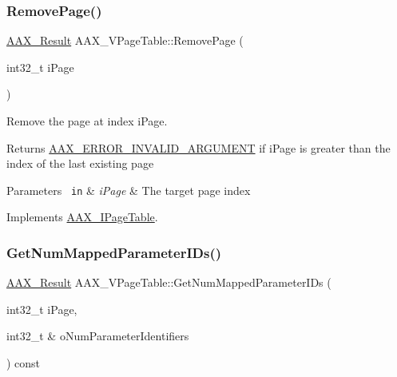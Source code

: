 \subsubsection{\texorpdfstring{RemovePage()}{RemovePage()}}
{\footnotesize\ttfamily \mbox{\hyperlink{a00392_a4d8f69a697df7f70c3a8e9b8ee130d2f}{A\+A\+X\+\_\+\+Result}} A\+A\+X\+\_\+\+V\+Page\+Table\+::\+Remove\+Page (\begin{DoxyParamCaption}\item[{int32\+\_\+t}]{i\+Page }\end{DoxyParamCaption})\hspace{0.3cm}{\ttfamily [virtual]}}



Remove the page at index {\ttfamily i\+Page}. 

\begin{DoxyReturn}{Returns}
\mbox{\hyperlink{a00494_a5f8c7439f3a706c4f8315a9609811937a7d27a3bd88231e331c98d85f5b10e2eb}{A\+A\+X\+\_\+\+E\+R\+R\+O\+R\+\_\+\+I\+N\+V\+A\+L\+I\+D\+\_\+\+A\+R\+G\+U\+M\+E\+NT}} if {\ttfamily i\+Page} is greater than the index of the last existing page
\end{DoxyReturn}

\begin{DoxyParams}[1]{Parameters}
\mbox{\texttt{ in}}  & {\em i\+Page} & The target page index \\
\hline
\end{DoxyParams}


Implements \mbox{\hyperlink{a01849_a2e5def73da595907d6486ff199168dd3}{A\+A\+X\+\_\+\+I\+Page\+Table}}.

\mbox{\label{a01929_a0fd89bed544e1688aa64644893f2865b}} 
\subsubsection{\texorpdfstring{GetNumMappedParameterIDs()}{GetNumMappedParameterIDs()}}
{\footnotesize\ttfamily \mbox{\hyperlink{a00392_a4d8f69a697df7f70c3a8e9b8ee130d2f}{A\+A\+X\+\_\+\+Result}} A\+A\+X\+\_\+\+V\+Page\+Table\+::\+Get\+Num\+Mapped\+Parameter\+I\+Ds (\begin{DoxyParamCaption}\item[{int32\+\_\+t}]{i\+Page,  }\item[{int32\+\_\+t \&}]{o\+Num\+Parameter\+Identifiers }\end{DoxyParamCaption}) const\hspace{0.3cm}{\ttfamily [virtual]}}




